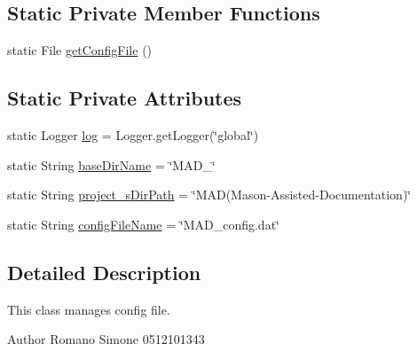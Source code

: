 \subsection*{Static Private Member Functions}
\begin{DoxyCompactItemize}
\item 
static File \hyperlink{classit_1_1isislab_1_1masonassisteddocumentation_1_1mason_1_1control_1_1_config_file_af791ff01652e95f6385641909b805e20}{get\-Config\-File} ()
\end{DoxyCompactItemize}
\subsection*{Static Private Attributes}
\begin{DoxyCompactItemize}
\item 
static Logger \hyperlink{classit_1_1isislab_1_1masonassisteddocumentation_1_1mason_1_1control_1_1_config_file_a233d40b4ec2b6609570825bedaa9f6e5}{log} = Logger.\-get\-Logger(\char`\"{}global\char`\"{})
\item 
static String \hyperlink{classit_1_1isislab_1_1masonassisteddocumentation_1_1mason_1_1control_1_1_config_file_a221de037cd407ebbe144ef1dd91b82d2}{base\-Dir\-Name} = \char`\"{}M\-A\-D\-\_\-\char`\"{}
\item 
static String \hyperlink{classit_1_1isislab_1_1masonassisteddocumentation_1_1mason_1_1control_1_1_config_file_a91a0d496b1cb5b351d2b0452fa71f763}{project\-\_\-s\-Dir\-Path} = \char`\"{}M\-A\-D(Mason-\/Assisted-\/Documentation)\char`\"{}
\item 
static String \hyperlink{classit_1_1isislab_1_1masonassisteddocumentation_1_1mason_1_1control_1_1_config_file_abcfdfd0e472ce37556509fbe6ec06a10}{config\-File\-Name} = \char`\"{}M\-A\-D\-\_\-config.\-dat\char`\"{}
\end{DoxyCompactItemize}


\subsection{Detailed Description}
This class manages config file.

\begin{DoxyAuthor}{Author}
Romano Simone 0512101343 
\end{DoxyAuthor}


